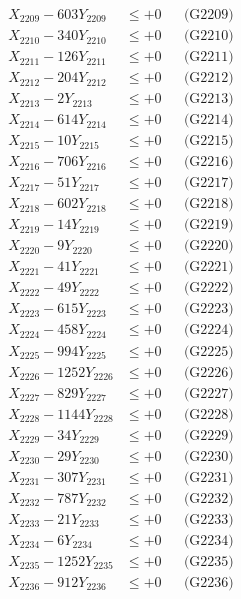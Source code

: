 \documentclass[a4paper,10pt]{article}
\begin{document}
{\begin{align}
X_{2209} - 603Y_{2209} &\leq +0 && \text{(G2209)} \\
X_{2210} - 340Y_{2210} &\leq +0 && \text{(G2210)} \\
\allowbreak
X_{2211} - 126Y_{2211} &\leq +0 && \text{(G2211)} \\
X_{2212} - 204Y_{2212} &\leq +0 && \text{(G2212)} \\
X_{2213} - 2Y_{2213} &\leq +0 && \text{(G2213)} \\
X_{2214} - 614Y_{2214} &\leq +0 && \text{(G2214)} \\
X_{2215} - 10Y_{2215} &\leq +0 && \text{(G2215)} \\
X_{2216} - 706Y_{2216} &\leq +0 && \text{(G2216)} \\
X_{2217} - 51Y_{2217} &\leq +0 && \text{(G2217)} \\
X_{2218} - 602Y_{2218} &\leq +0 && \text{(G2218)} \\
X_{2219} - 14Y_{2219} &\leq +0 && \text{(G2219)} \\
X_{2220} - 9Y_{2220} &\leq +0 && \text{(G2220)} \\
\allowbreak
X_{2221} - 41Y_{2221} &\leq +0 && \text{(G2221)} \\
X_{2222} - 49Y_{2222} &\leq +0 && \text{(G2222)} \\
X_{2223} - 615Y_{2223} &\leq +0 && \text{(G2223)} \\
X_{2224} - 458Y_{2224} &\leq +0 && \text{(G2224)} \\
X_{2225} - 994Y_{2225} &\leq +0 && \text{(G2225)} \\
X_{2226} - 1252Y_{2226} &\leq +0 && \text{(G2226)} \\
X_{2227} - 829Y_{2227} &\leq +0 && \text{(G2227)} \\
X_{2228} - 1144Y_{2228} &\leq +0 && \text{(G2228)} \\
X_{2229} - 34Y_{2229} &\leq +0 && \text{(G2229)} \\
X_{2230} - 29Y_{2230} &\leq +0 && \text{(G2230)} \\
\allowbreak
X_{2231} - 307Y_{2231} &\leq +0 && \text{(G2231)} \\
X_{2232} - 787Y_{2232} &\leq +0 && \text{(G2232)} \\
X_{2233} - 21Y_{2233} &\leq +0 && \text{(G2233)} \\
X_{2234} - 6Y_{2234} &\leq +0 && \text{(G2234)} \\
X_{2235} - 1252Y_{2235} &\leq +0 && \text{(G2235)} \\
X_{2236} - 912Y_{2236} &\leq +0 && \text{(G2236)} \\

\end{align}}
\end{document}
